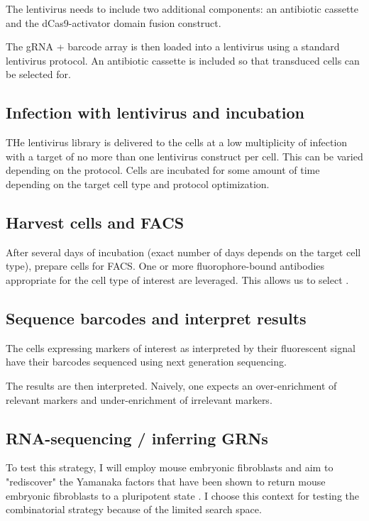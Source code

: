 \documentclass[10pt]{article}
\begin{document}
The lentivirus needs to include two additional components: an antibiotic cassette and the dCas9-activator domain fusion construct.

The gRNA + barcode array is then loaded into a lentivirus using a standard lentivirus protocol. An antibiotic cassette is included so that transduced cells can be selected for.

\subsection*{Infection with lentivirus and incubation}

THe lentivirus library is delivered to the cells at a low multiplicity of infection with a target of no more than one lentivirus construct per cell. This can be varied depending on the protocol. Cells are incubated for some amount of time depending on the target cell type and protocol optimization.

\subsection*{Harvest cells and FACS}

After several days of incubation (exact number of days depends on the target cell type), prepare cells for FACS. One or more fluorophore-bound antibodies appropriate for the cell type of interest are leveraged. This allows us to select .

\subsection*{Sequence barcodes and interpret results}

The cells expressing markers of interest as interpreted by their fluorescent signal have their barcodes sequenced using next generation sequencing.

The results are then interpreted. Naively, one expects an over-enrichment of relevant markers and under-enrichment of irrelevant markers.


\subsection*{RNA-sequencing / inferring GRNs}

To test this strategy, I will employ mouse embryonic fibroblasts and aim to "rediscover" the Yamanaka factors that have been shown to return mouse embryonic fibroblasts to a pluripotent state \cite{takahashi2006induction}. I choose this context for testing the combinatorial strategy because of the limited search space.
\end{document}
